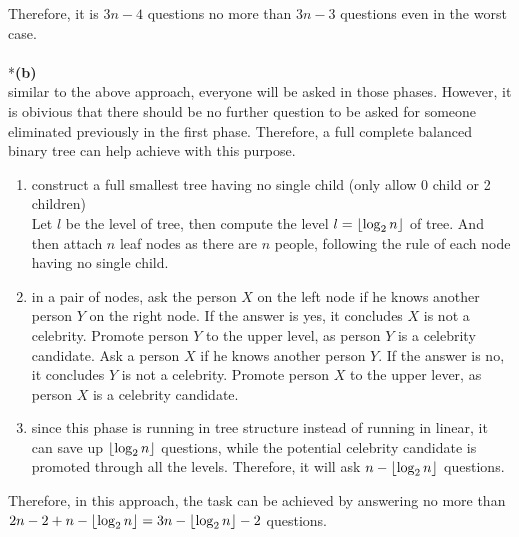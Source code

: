 \documentclass[a4paper]{scrartcl}
\begin{document}
Therefore, it is $3n-4$ questions no more than $3n-3$ questions even in the worst case.
\\
\\*{\bfseries(b)}\\
 similar to the above approach, everyone will be asked in those phases. However, it is obivious that there should be no further question to be asked for someone eliminated previously in the first phase. Therefore, a full complete balanced binary tree can help achieve with this purpose.
\begin{enumerate}
  \item construct a full smallest tree having no single child (only allow 0 child or 2 children)\\
  Let $l$ be the level of tree, then compute the level $l =\left\lfloor \log_2{n} \right\rfloor$ of tree. And then attach $n$ leaf nodes as there are $n$ people, following the rule of each node having no single child.

  \item in a pair of nodes, ask the person $X$ on the left node if he knows another person $Y$ on the right node. If the answer is yes, it concludes $X$ is not a celebrity. Promote person $Y$ to the upper level, as person $Y$ is a celebrity candidate. Ask a person $X$ if he knows another person $Y$. If the answer is no, it concludes $Y$ is not a celebrity. Promote person $X$ to the upper lever, as person $X$ is a celebrity candidate.

  \item since this phase is running in tree structure instead of running in linear, it can save up $\left\lfloor \log_2{n} \right\rfloor$ questions, while the potential celebrity candidate is promoted through all the levels. Therefore, it will ask $n-\left\lfloor \log_2{n} \right\rfloor$ questions.
\end{enumerate}
Therefore, in this approach, the task can be achieved by answering no more than $2n-2+n-\left\lfloor \log_2{n} \right\rfloor=3n-\left\lfloor \log_2{n} \right\rfloor-2$ questions.
\end{document}
